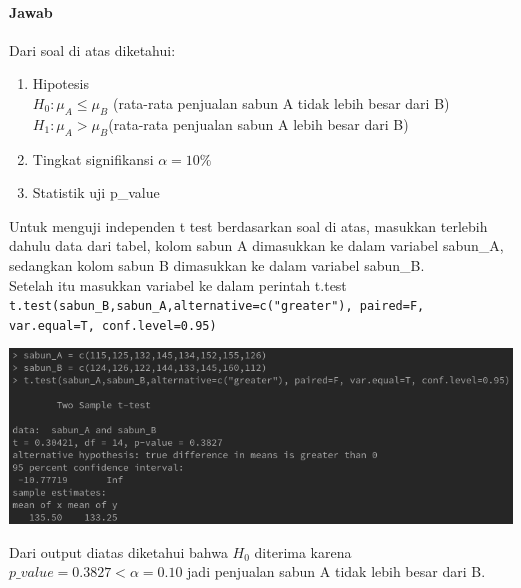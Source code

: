 \documentclass[a4paper,12pt]{article}
\begin{document}
\paragraph{Jawab\\}
Dari soal di atas diketahui:
\begin{enumerate}[label = \alph*.]
    \item Hipotesis \\
        $H_{0} : \mu_{A} \leq \mu_{B}$ (rata-rata penjualan sabun A tidak lebih besar dari B)\\
        $H_{1} : \mu_{A} > \mu_{B}$(rata-rata penjualan sabun A lebih besar dari B)
    \item Tingkat signifikansi $\alpha = 10\%$
    \item Statistik uji p\_value
\end{enumerate}
Untuk menguji independen t test berdasarkan soal di atas, masukkan terlebih dahulu data dari tabel, kolom sabun A dimasukkan ke dalam variabel sabun\_A, sedangkan kolom sabun B dimasukkan ke 
dalam variabel sabun\_B.\\
Setelah itu masukkan variabel ke dalam perintah t.test\\
\texttt{t.test(sabun\_B,sabun\_A,alternative=c("greater"), paired=F, var.equal=T, conf.level=0.95)}
\begin{center}
    \includegraphics[width = \linewidth]{tugas2.png}
\end{center}
Dari output diatas diketahui bahwa $H_{0}$ diterima karena $p\_value = 0.3827 < \alpha = 0.10$ jadi penjualan sabun A tidak lebih besar dari B.
\end{document}
